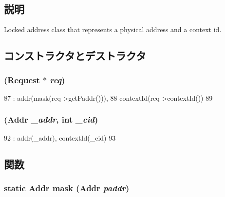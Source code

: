 \subsection{説明}
Locked address class that represents a physical address and a context id. 

\subsection{コンストラクタとデストラクタ}
\hypertarget{classLockedAddr_a4a46255d3609634bae77118998fc49c6}{
\subsubsection[{LockedAddr}]{ ({\bf Request} $\ast$ {\em req})}}
\label{classLockedAddr_a4a46255d3609634bae77118998fc49c6}



\begin{DoxyCode}
87                              : addr(mask(req->getPaddr())),
88                                contextId(req->contextId())
89     {}
\end{DoxyCode}
\hypertarget{classLockedAddr_af218a9f6d520788d30200f2dfdbdd2fc}{
\subsubsection[{LockedAddr}]{ ({\bf Addr} {\em \_\-addr}, \/  int {\em \_\-cid})}}
\label{classLockedAddr_af218a9f6d520788d30200f2dfdbdd2fc}



\begin{DoxyCode}
92                                      : addr(_addr), contextId(_cid)
93     {}
\end{DoxyCode}


\subsection{関数}
\hypertarget{classLockedAddr_a9b993266e635c8e28d2bc0a5123351b1}{
\subsubsection[{mask}]{\setlength{\rightskip}{0pt plus 5cm}static {\bf Addr} mask ({\bf Addr} {\em paddr})}}
\label{classLockedAddr_a9b993266e635c8e28d2bc0a5123351b1}



